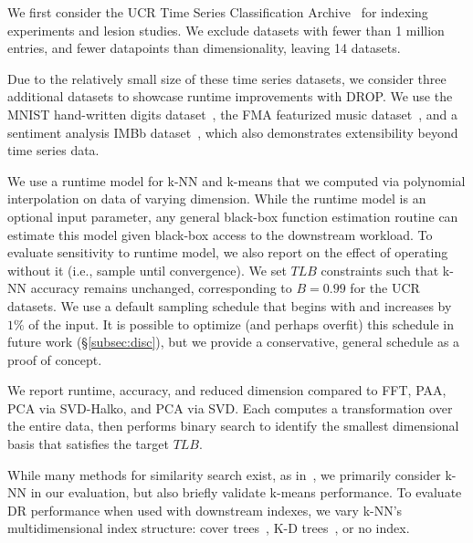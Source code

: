 We first consider the UCR Time Series Classification Archive~\cite{ucr} for indexing experiments and lesion studies. 
We exclude datasets with fewer than 1 million entries, and fewer datapoints than dimensionality, leaving 14 datasets. 

Due to the relatively small size of these time series datasets, we consider three additional datasets to showcase runtime improvements with DROP.
We use the MNIST hand-written digits dataset~\cite{mnist}, the FMA featurized music dataset~\cite{fma}, and a sentiment analysis IMBb dataset~\cite{imdb}, which also demonstrates extensibility beyond time series data. 

 We use a runtime model for k-NN and k-means that we computed via polynomial interpolation on data of varying dimension.
While the runtime model is an optional input parameter, any general black-box function estimation routine can estimate this model given black-box access to the downstream workload.
To evaluate sensitivity to runtime model, we also report on the effect of operating without it (i.e., sample until convergence).
We set $TLB$ constraints such that k-NN accuracy remains unchanged, corresponding to $B = 0.99$  for the UCR datasets.
We use a default sampling schedule that begins with and increases by $1\%$ of the input.
It is possible to optimize (and perhaps overfit) this schedule in future work (\S\ref{subsec:disc}), but we provide a conservative, general schedule as a proof of concept.

 We report runtime, accuracy, and reduced dimension compared to FFT, PAA, PCA via SVD-Halko, and PCA via SVD. 
Each computes a transformation over the entire data, then performs binary search to identify the smallest dimensional basis that satisfies the target $TLB$. 

While many methods for similarity search exist, as in~\cite{keogh-study}, we primarily consider k-NN in our evaluation, but also briefly validate k-means performance.
To evaluate DR performance when used with downstream indexes, we vary k-NN's multidimensional index structure: cover trees~\cite{ctree}, K-D trees~\cite{kdtree}, or no index. 

